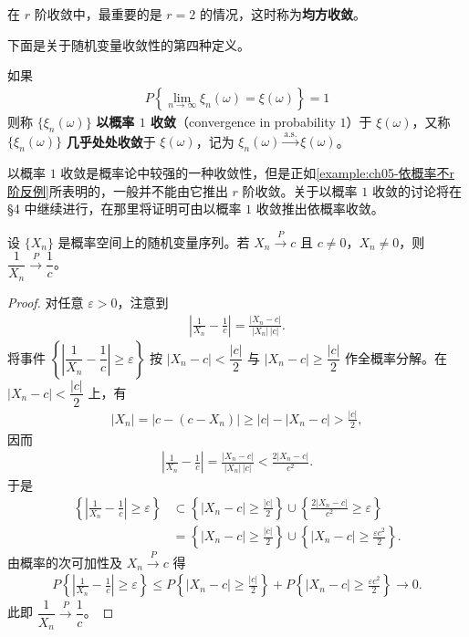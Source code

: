 \documentclass[../../main.tex]{subfiles}
\begin{document}
在 $r$ 阶收敛中，最重要的是 $r=2$ 的情况，这时称为\textbf{均方收敛}。

下面是关于随机变量收敛性的第四种定义。

\begin{definition}[以概率 $1$ 收敛]\label{definition:ch05-以概率1收敛}
如果
\begin{align}
P\!\left\{\lim_{n\to\infty}\xi_n(\omega)=\xi(\omega)\right\}=1
\end{align}
则称 $\{\xi_n(\omega)\}$ \textbf{以概率 $1$ 收敛}（convergence in probability $1$）于 $\xi(\omega)$，又称 $\{\xi_n(\omega)\}$ \textbf{几乎处处收敛}于 $\xi(\omega)$，记为 $\xi_n(\omega)\xrightarrow{\mathrm{a.s.}}\xi(\omega)$。
\end{definition}

以概率 $1$ 收敛是概率论中较强的一种收敛性，但是正如\cref{example:ch05-依概率不r阶反例}所表明的，一般并不能由它推出 $r$ 阶收敛。关于以概率 $1$ 收敛的讨论将在 \S4 中继续进行，在那里将证明可由以概率 $1$ 收敛推出依概率收敛。

\begin{theorem}[依概率收敛的性质]\label{theorem:ch05-依概率收敛的性质}
设 $\{X_n\}$ 是概率空间上的随机变量序列。若 $X_n\xrightarrow{P}c$ 且 $c\neq0$，$X_n\neq0$，则 $\dfrac{1}{X_n}\xrightarrow{P}\dfrac{1}{c}$。
\end{theorem}

\begin{proof}
对任意 $\varepsilon>0$，注意到
\begin{align}
\left|\frac{1}{X_n}-\frac{1}{c}\right|=\frac{|X_n-c|}{|X_n|\,|c|}.\label{align:ch05-依概率收敛性质}
\end{align}
将事件 $\left\{\left|\dfrac{1}{X_n}-\dfrac{1}{c}\right|\geqslant\varepsilon\right\}$ 按 $|X_n-c|<\dfrac{|c|}{2}$ 与 $|X_n-c|\geqslant\dfrac{|c|}{2}$ 作全概率分解。在 $|X_n-c|<\dfrac{|c|}{2}$ 上，有
\begin{align*}
|X_n|=|c-(c-X_n)|\geqslant|c|-|X_n-c|>\frac{|c|}{2},
\end{align*}
因而
\begin{align*}
\left|\frac{1}{X_n}-\frac{1}{c}\right|=\frac{|X_n-c|}{|X_n|\,|c|}<\frac{2|X_n-c|}{c^{2}}.
\end{align*}
于是
\begin{align*}
\left\{\left|\frac{1}{X_n}-\frac{1}{c}\right|\geqslant\varepsilon\right\}
&\subset\left\{|X_n-c|\geqslant\frac{|c|}{2}\right\}
\cup\left\{\frac{2|X_n-c|}{c^{2}}\geqslant\varepsilon\right\}\\
&=\left\{|X_n-c|\geqslant\frac{|c|}{2}\right\}\cup\left\{|X_n-c|\geqslant\frac{\varepsilon c^{2}}{2}\right\}.
\end{align*}
由概率的次可加性及 $X_n\xrightarrow{P}c$ 得
\begin{align*}
P\!\left\{\left|\frac{1}{X_n}-\frac{1}{c}\right|\geqslant\varepsilon\right\}
\leqslant P\!\left\{|X_n-c|\geqslant\frac{|c|}{2}\right\}
+P\!\left\{|X_n-c|\geqslant\frac{\varepsilon c^{2}}{2}\right\}\to 0.
\end{align*}
此即 $\dfrac{1}{X_n}\xrightarrow{P}\dfrac{1}{c}$。
\end{proof}
\end{document}
